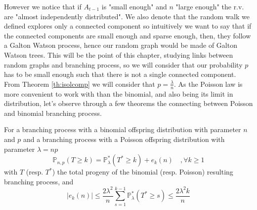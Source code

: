 However we notice that if $A_{t-1}$ is "small enough" and $n$ "large enough" the r.v. are "almost independently distributed".
We also denote that the random walk we defined explores only a connected component so intuitively we want to say that if the connected components are small enough and sparse enough, then, they follow a Galton Watson process, hence our random graph would be made of Galton Watson trees.
This will be the point of this chapter, studying links between random graphs and branching process, so we will consider that our probability $p$ has to be small enough such that there is not a single connected component. From Theorem \ref{th:isolcomp} we will consider that $p=\frac{\lambda}{n}$.
\newline
As the Poisson law is more convenient to work with than the binomial, and also being its limit in distribution, let's observe through a few theorems the connecting between Poisson and binomial branching process.
\begin{theorem}\label{th:poibin}
For a branching process with a binomial offspring distribution with parameter $n$ and $p$ and a branching process with a Poisson offspring distribution with parameter $\lambda = np$
	\begin{equation}
		\mathbb{P}_{n,p}(T \geq k) = \mathbb{P}_{\lambda}^*(T^* \geq k) + e_k(n)\quad, \forall k \geq 1
	\end{equation}
	with $T$ (resp. $T^*$) the total progeny of the binomial (resp. Poisson) resulting branching process, and 
	\begin{equation}
		|e_k(n)| \leq \frac{2\lambda ^2}{n}\sum_{s=1}^{k-1} \mathbb{P}_{\lambda}^*(T^* \geq s) \leq \frac{2\lambda ^2k}{n}
	\end{equation}
\end{theorem}
